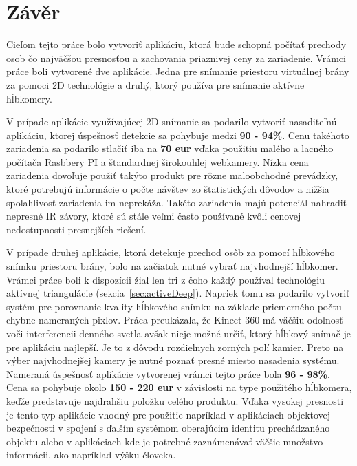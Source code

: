 
\chapter{Závěr}
Cieľom tejto práce bolo vytvoriť aplikáciu, ktorá bude schopná počítať prechody osob čo najväčšou presnosťou a zachovania priaznivej ceny za zariadenie. Vrámci práce boli vytvorené dve aplikácie. Jedna pre snímanie priestoru virtuálnej brány za pomoci 2D technológie a druhý, ktorý používa pre snímanie aktívne hĺbkomery.

V prípade aplikácie využívajúcej 2D snímanie sa podarilo vytvoriť nasaditeľnú aplikáciu, ktorej úspešnosť detekcie sa pohybuje medzi \textbf{90 - 94\%}. Cenu takéhoto zariadenia sa podarilo stlačiť iba na \textbf{70 eur} vďaka použitiu malého a lacného počítača Rasbbery PI a štandardnej širokouhlej webkamery. Nízka cena zariadenia dovoľuje použiť takýto produkt pre rôzne maloobchodné prevádzky, ktoré potrebujú informácie o počte návštev zo štatistických dôvodov a nižšia spoľahlivosť zariadenia im neprekáža. Takéto zariadenia majú potenciál nahradiť nepresné IR závory, ktoré sú stále veľmi často používané kvôli cenovej nedostupnosti presnejších riešení.

V prípade druhej aplikácie, ktorá detekuje prechod osôb za pomocí hĺbkového snímku priestoru brány, bolo na začiatok nutné vybrať najvhodnejší hĺbkomer. Vrámci práce boli k dispozícii žiaľ len tri z čoho každý používal technológiu aktívnej triangulácie (sekcia~\ref{sec:activeDeep}). Napriek tomu sa podarilo vytvoriť systém pre porovnanie kvality hĺbkového snímku na základe priemerného počtu chybne nameraných pixlov. Práca preukázala, že Kinect 360 má väčšiu odolnosť voči interferencii denného svetla avšak nieje možné určiť, ktorý hĺbkový snímač je pre aplikáciu najlepší. Je to z dôvodu rozdielnych zorných polí kamier. Preto na výber najvhodnejšej kamery je nutné poznať presné miesto nasadenia systému. Nameraná úspešnosť aplikácie vytvorenej vrámci tejto práce bola \textbf{96 - 98\%}. Cena sa pohybuje okolo \textbf{150 - 220 eur} v závislosti na type použitého hĺbkomera, keďže predstavuje najdrahšiu položku celého produktu. Vďaka vysokej presnosti je tento typ aplikácie vhodný pre použitie napríklad v aplikáciach objektovej bezpečnosti v spojení s ďalším systémom oberajúcim identitu prechádzaného objektu alebo v aplikáciach kde je potrebné zaznámenávať väčšie množstvo informácii, ako napríklad výšku človeka.

